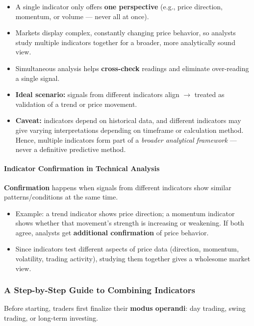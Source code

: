 \documentclass[12pt,openany]{book}
\begin{document}
\begin{itemize}[leftmargin=*]
    \item A single indicator only offers \textbf{one perspective} (e.g., price direction, momentum, or volume --- never all at once).
    \item Markets display complex, constantly changing price behavior, so analysts study multiple indicators together for a broader, more analytically sound view.
    \item Simultaneous analysis helps \textbf{cross-check} readings and eliminate over-reading a single signal.
    \item \textbf{Ideal scenario:} signals from different indicators align \(\rightarrow\) treated as validation of a trend or price movement.
    \item \textbf{Caveat:} indicators depend on historical data, and different indicators may give varying interpretations depending on timeframe or calculation method. Hence, multiple indicators form part of a \emph{broader analytical framework} --- never a definitive predictive method.
\end{itemize}

\paragraph{Indicator Confirmation in Technical Analysis}

\textbf{Confirmation} happens when signals from different indicators show similar patterns/conditions at the same time.

\begin{itemize}[leftmargin=*]
    \item Example: a trend indicator shows price direction; a momentum indicator shows whether that movement's strength is increasing or weakening. If both agree, analysts get \textbf{additional confirmation} of price behavior.
    \item Since indicators test different aspects of price data (direction, momentum, volatility, trading activity), studying them together gives a wholesome market view.
\end{itemize}

\subsubsection{A Step-by-Step Guide to Combining Indicators}

Before starting, traders first finalize their \textbf{modus operandi}: day trading, swing trading, or long-term investing.
\end{document}
